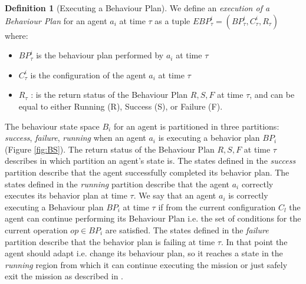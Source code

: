 \documentclass[journal]{IEEEtran}
\theoremstyle{definition}
\newtheorem{definition}{Definition}
\newcommand\patrizio[1]{\nb{Patrizio}{#1}}
\newcommand\ivano[1]{\nb{Ivano}{#1}}
\begin{document}
\begin{definition}[Executing a Behaviour Plan]
We define an \textit{execution of a Behaviour Plan} for an agent $a_i$ at time $\tau$ as a tuple $EBP^i_\tau=(BP^i_\tau, C^i_\tau,  R_\tau)$ where: 
\begin{itemize} 
\item $BP^i_\tau$ is the behaviour plan performed by $a_i$ at time $\tau$
\item $C^i_\tau$ is the configuration of the agent $a_i$ at time $\tau$ 
\item $R_\tau$ : is the return status of the Behaviour Plan ${R, S, F}$ at time $\tau$, and can be equal to either Running (R), Success (S), or Failure (F).
\end{itemize}
\end{definition}


The behaviour state space $B_i$ for an agent is partitioned in three partitions: \textit{success}, \textit{failure}, \textit{running} when an agent $a_i$ is executing a behavior plan $BP_i$ (Figure \ref{fig:BS}). The return status of the Behaviour Plan ${R, S, F}$ at time $\tau$ describes in which partition an agent's state is. The states defined in the \textit{success} partition describe that the agent successfully completed its behavior plan. 
The states defined in the \textit{running} partition describe that the agent $a_i$ correctly executes its behavior plan at time $\tau$. We say that an agent $a_i$ is correctly executing a Behaviour plan $BP_i$ at time $\tau$ if from the current configuration $C_l$ the agent can continue performing its Behaviour Plan i.e. the set of conditions for the current operation $op \in BP_i$ are satisfied. %
The states defined in the \textit{failure} partition describe that the behavior plan is failing at time $\tau$. In that point the agent should adapt i.e. change its behaviour plan, so it reaches a state in the \textit{running} region from which it can continue executing the mission or just safely exit the mission as described in \cite{di2013engineering}.
\end{document}
